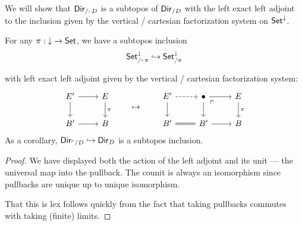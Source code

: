 We will show that $\operatorname{\mathsf{{Dir}}}_{/_{\ulcorner} D}$ is a subtopos of $\operatorname{\mathsf{{Dir}}}_{/D}$ with the
left exact left adjoint to the inclusion given by the vertical / cartesian factorization system on $\operatorname{\mathsf{{Set}}}^{\mathbin{\downarrow}}$.

\begin{thm}
  For any $\pi : \mathbin{\downarrow} \to \operatorname{\mathsf{{Set}}}$, we have a subtopos inclusion
  $$\operatorname{\mathsf{{Set}}}^{\mathbin{\downarrow}}_{/_{\ulcorner} \pi} \hookrightarrow \operatorname{\mathsf{{Set}}}^{\mathbin{\downarrow}}_{/\pi}$$

  with left exact left adjoint given by the vertical / cartesian factorization system:
  \[
\begin{tikzcd}
E' \arrow[r] \arrow[d] & E \arrow[d, "\pi"] \\
B' \arrow[r]           & B                 
\end{tikzcd} \quad\quad\mapsto\quad\quad
\begin{tikzcd}
E' \arrow[d] \arrow[r, dashed]    & \bullet \arrow[d] \arrow[r] \arrow[rd, phantom, "\ulcorner" very near start] & E \arrow[d, "\pi"] \\
B' \arrow[r, equals] & B' \arrow[r]                           & B                 
\end{tikzcd}
  \]
  As a corollary, $\operatorname{\mathsf{{Dir}}}_{\ulcorner/D} \hookrightarrow \operatorname{\mathsf{{Dir}}}_{D}$ is a
  subtopos inclusion.
\end{thm}
\begin{proof}
We have displayed both the action of the left adjoint and its unit --- the
universal map into the pullback. The
counit is always an isomorphism since pullbacks are unique up to unique
isomorphism.

That this is lex follows quickly from the fact that taking pullbacks commutes
with taking (finite) limits. 
\end{proof}










